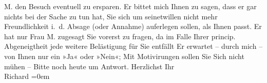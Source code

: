 \begin{ledgroupsized}[t]{13cm}
                  M. den Besuch \introOben{}eventuell\introOben{} zu ersparen. Er bittet mich Ihnen zu sagen, dass er gar nichts
               bei der Sache zu tun hat, Sie sich um seinetwillen nicht mehr {\pb}Freundlichkeit i. d. Absage (oder
               Annahme) auferlegen sollen, als  Ihnen passt. Er
               hat nur Frau M. zugesagt Sie vorerst zu
               fragen, da im Falle Ihrer princip. Abgeneigtheit jede weitere Belästigung für Sie
               entfällt\pend
           \pstart
           Er erwartet – durch mich – von Ihnen nur ein »Ja« oder »Nein«; \introOben{}Mit\introOben{} Motivirungen sollen Sie Sich nicht mühen –\pend
           \pstart
           Bitte noch heute um Antwort. Herzlichst\pend
           \pstart
           Ihr{\\[\baselineskip]}\spacefill\mbox{Richard}\pend
           \leftskip=0em{}
         
         \endnumbering{}\end{ledgroupsized}  \newcommand{\dateiname}{L01976}\newcommand{\titel}{Richard Beer-Hofmann an Arthur Schnitzler, 3. 11. 1910}\newcommand{\editorInnen}{Martin Anton Müller und Gerd-Hermann Susen}
      